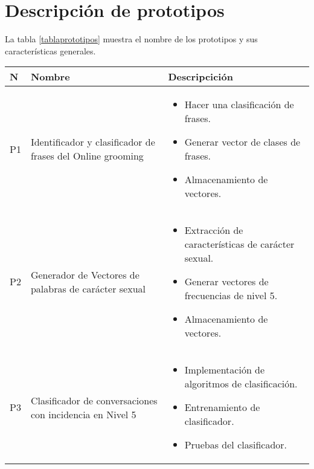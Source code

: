 \section{Descripci\'on de prototipos}

La tabla \ref{tablaprototipos} muestra el nombre de los prototipos y sus caracter\'isticas generales.



\begin{table}[h]

\begin{center}


\begin{tabular}{|l|p{45mm}|p{80mm}|}
\hline

N & Nombre & Descripcici\'on \\

\hline

P1 & Identificador y clasificador de frases del Online grooming & \begin{itemize}
\item Hacer una clasificaci\'on de frases.
\item Generar vector de clases de frases.
\item Almacenamiento de vectores.
\end{itemize} \\

\hline 

P2 & Generador de Vectores de palabras de car\'acter sexual & \begin{itemize}
\item Extracci\'on de caracter\'isticas de car\'acter sexual.
\item Generar vectores de frecuencias de nivel 5.
\item Almacenamiento de vectores. 

\end{itemize} \\

\hline 


P3 & Clasificador de conversaciones con incidencia en Nivel 5 & \begin{itemize}
\item Implementaci\'on de algoritmos de clasificaci\'on.
\item Entrenamiento de clasificador.
\item Pruebas del clasificador.
\end{itemize} \\

\hline 




\end{tabular}
\end{center}
\end{table}

